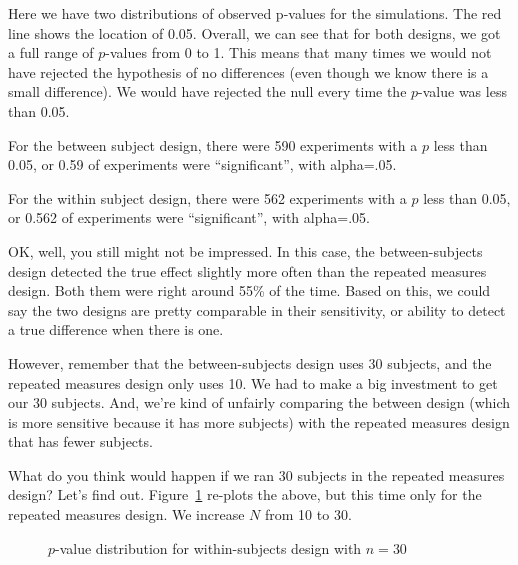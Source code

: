 \documentclass[
  letterpaper,
  DIV=11,
  numbers=noendperiod]{scrreprt}
\begin{document}
Here we have two distributions of observed p-values for the simulations.
The red line shows the location of 0.05. Overall, we can see that for
both designs, we got a full range of \(p\)-values from 0 to 1. This
means that many times we would not have rejected the hypothesis of no
differences (even though we know there is a small difference). We would
have rejected the null every time the \(p\)-value was less than 0.05.

For the between subject design, there were 590 experiments with a \(p\)
less than 0.05, or 0.59 of experiments were ``significant'', with
alpha=.05.

For the within subject design, there were 562 experiments with a \(p\)
less than 0.05, or 0.562 of experiments were ``significant'', with
alpha=.05.

OK, well, you still might not be impressed. In this case, the
between-subjects design detected the true effect slightly more often
than the repeated measures design. Both them were right around 55\% of
the time. Based on this, we could say the two designs are pretty
comparable in their sensitivity, or ability to detect a true difference
when there is one.

However, remember that the between-subjects design uses 30 subjects, and
the repeated measures design only uses 10. We had to make a big
investment to get our 30 subjects. And, we're kind of unfairly comparing
the between design (which is more sensitive because it has more
subjects) with the repeated measures design that has fewer subjects.

What do you think would happen if we ran 30 subjects in the repeated
measures design? Let's find out. Figure~\ref{fig-9pdistwithin} re-plots
the above, but this time only for the repeated measures design. We
increase \(N\) from 10 to 30.

\begin{figure}


\caption{\label{fig-9pdistwithin}\(p\)-value distribution for
within-subjects design with \(n = 30\)}

\end{figure}%
\end{document}
